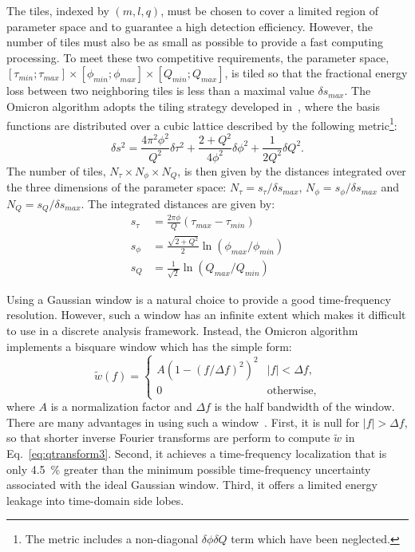 The tiles, indexed by $(m,l,q)$, must be chosen to cover a limited region of parameter space and to guarantee a high detection efficiency. However, the number of tiles must also be as small as possible to provide a fast computing processing. To meet these two competitive requirements, the parameter space, $[\tau_{min};\tau_{max}]\times [\phi_{min};\phi_{max}] \times [Q_{min};Q_{max}]$, is tiled so that the fractional energy loss between two neighboring tiles is less than a maximal value $\delta s_{max}$. The Omicron algorithm adopts the tiling strategy developed in~\cite{Chatterji:2004}, where the basis functions are distributed over a cubic lattice described by the following metric\footnote{The metric includes a non-diagonal $\delta \phi \delta Q$ term which have been neglected.}:
\begin{equation}
  \delta s^2 =
  \frac{4\pi^2\phi^2}{Q^2}\delta \tau^2
  + \frac{2+Q^2}{4\phi^2}\delta \phi^2
  + \frac{1}{2Q^2}\delta Q^2.
  \label{eq:tilemetric}
\end{equation}
The number of tiles, $N_\tau \times N_\phi \times N_Q$, is then given by the distances integrated over the three dimensions of the parameter space: $N_\tau = s_\tau/\delta s_{max}$, $N_\phi = s_\phi/\delta s_{max}$ and $N_Q = s_Q/\delta s_{max}$. The integrated distances are given by:
\begin{equation}
  \begin{array}{ll}
    s_\tau & = \frac{2\pi\phi}{Q}(\tau_{max} - \tau_{min}) \\
    s_\phi & = \frac{\sqrt{2+Q^2}}{2}\ln(\phi_{max}/\phi_{min}) \\
    s_Q   & = \frac{1}{\sqrt{2}}\ln(Q_{max}/Q_{min})
  \end{array}
  \label{eq:tiledistance}
\end{equation}


Using a Gaussian window is a natural choice to provide a good time-frequency resolution. However, such a window has an infinite extent which makes it difficult to use in a discrete analysis framework. Instead, the Omicron algorithm implements a bisquare window which has the simple form:
\begin{equation}
  \tilde{w}(f) = 
  \begin{cases}
    A\left(1 - (f/\Delta f)^2 \right)^2 & |f| < \Delta f, \\
    0 & \textrm{otherwise},
  \end{cases}
  \label{eq:bisquare}
\end{equation}
where $A$ is a normalization factor and $\Delta f$ is the half bandwidth of the window.
There are many advantages in using such a window~\cite{Chatterji:2004}. First, it is null for $|f| > \Delta f$, so that shorter inverse Fourier transforms are perform to compute $\tilde{w}$ in Eq.~\ref{eq:qtransform3}. Second, it achieves a time-frequency localization that is only 4.5~\% greater than the minimum possible time-frequency uncertainty associated with the ideal Gaussian window. Third, it offers a limited energy leakage into time-domain side lobes.



